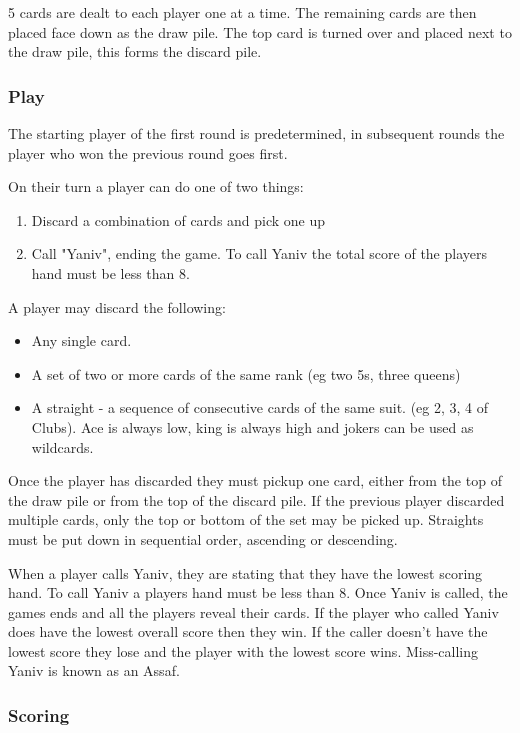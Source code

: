 \documentclass[../main.tex]{subfiles}
\begin{document}
5 cards are dealt to each player one at a time. The remaining cards are then placed face down as the draw pile. The top card is turned over and placed next to the draw pile, this forms the discard pile. 

\subsubsection{Play}
The starting player of the first round is predetermined, in subsequent rounds the player who won the previous round goes first. 

On their turn a player can do one of two things:
\begin{enumerate}[nosep]
    \item Discard a combination of cards and pick one up
    \item Call "Yaniv", ending the game. To call Yaniv the total score of the players hand must be less than 8.
\end{enumerate}

A player may discard the following:
\begin{itemize}[nosep]
    \item Any single card.
    \item A set of two or more cards of the same rank (eg two 5s, three queens)
    \item A straight - a sequence of consecutive cards of the same suit. (eg 2, 3, 4 of Clubs). Ace is always low, king is always high and jokers can be used as wildcards.
\end{itemize}

Once the player has discarded they must pickup one card, either from the top of the draw pile or from the top of the discard pile. If the previous player discarded multiple cards, only the top or bottom of the set may be picked up. Straights must be put down in sequential order, ascending or descending. 

When a player calls Yaniv, they are stating that they have the lowest scoring hand. To call Yaniv a players hand must be less than 8. Once Yaniv is called, the games ends and all the players reveal their cards. If the player who called Yaniv does have the lowest overall score then they win. If the caller doesn't have the lowest score they lose and the player with the lowest score wins. Miss-calling Yaniv is known as an Assaf.

\subsubsection{Scoring}
\end{document}
